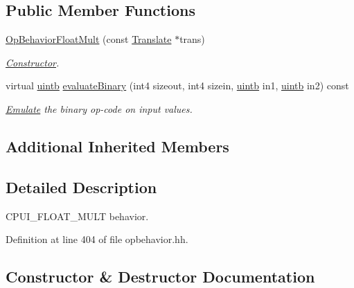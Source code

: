 \subsection*{Public Member Functions}
\begin{DoxyCompactItemize}
\item 
\mbox{\hyperlink{class_op_behavior_float_mult_aecdd799c32892d07968ee09f07c2b46d}{Op\+Behavior\+Float\+Mult}} (const \mbox{\hyperlink{class_translate}{Translate}} $\ast$trans)
\begin{DoxyCompactList}\small\item\em \mbox{\hyperlink{class_constructor}{Constructor}}. \end{DoxyCompactList}\item 
virtual \mbox{\hyperlink{types_8h_a2db313c5d32a12b01d26ac9b3bca178f}{uintb}} \mbox{\hyperlink{class_op_behavior_float_mult_aeaa5adbdc1db8b6351a974fa656bc649}{evaluate\+Binary}} (int4 sizeout, int4 sizein, \mbox{\hyperlink{types_8h_a2db313c5d32a12b01d26ac9b3bca178f}{uintb}} in1, \mbox{\hyperlink{types_8h_a2db313c5d32a12b01d26ac9b3bca178f}{uintb}} in2) const
\begin{DoxyCompactList}\small\item\em \mbox{\hyperlink{class_emulate}{Emulate}} the binary op-\/code on input values. \end{DoxyCompactList}\end{DoxyCompactItemize}
\subsection*{Additional Inherited Members}


\subsection{Detailed Description}
C\+P\+U\+I\+\_\+\+F\+L\+O\+A\+T\+\_\+\+M\+U\+LT behavior. 

Definition at line 404 of file opbehavior.\+hh.



\subsection{Constructor \& Destructor Documentation}
\mbox{\label{class_op_behavior_float_mult_aecdd799c32892d07968ee09f07c2b46d}} 
